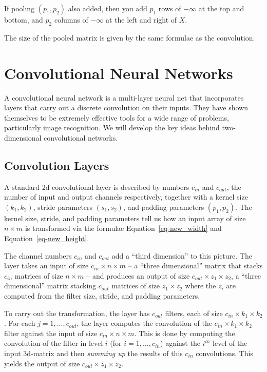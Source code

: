 \documentclass[
  11pt,
  letterpaper,
]{scrbook}
\theoremstyle{plain}
\theoremstyle{remark}
\begin{document}
If pooling \((p_1,p_2)\) also added, then you add \(p_1\) rows of
\(-\infty\) at the top and bottom, and \(p_2\) columns of \(-\infty\) at
the left and right of \(X\).

The size of the pooled matrix is given by the same formulae as the
convolution.

\hypertarget{convolutional-neural-networks}{%
\section{Convolutional Neural
Networks}\label{convolutional-neural-networks}}

A convolutional neural network is a multi-layer neural net that
incorporates layers that carry out a discrete convolution on their
inputs. They have shown themselves to be extremely effective tools for a
wide range of problems, particularly image recognition. We will develop
the key ideas behind two-dimensional convolutional networks.

\hypertarget{convolution-layers}{%
\subsection{Convolution Layers}\label{convolution-layers}}

A standard 2d convolutional layer is described by numbers \(c_{in}\) and
\(c_{out}\), the number of input and output channels respectively,
together with a kernel size \((k_1,k_2)\), stride parameters
\((s_{1},s_{2})\), and padding parameters \((p_{1},p_{2})\). The kernel
size, stride, and padding parameters tell us how an input array of size
\(n\times m\) is transformed via the formulae
Equation~\ref{eq-new_width} and Equation~\ref{eq-new_height}.

The channel numbers \(c_{in}\) and \(c_{out}\) add a ``third dimension''
to this picture. The layer takes an input of size
\(c_{in}\times n\times m\) -- a ``three dimensional'' matrix that stacks
\(c_{in}\) matrices of size \(n\times m\) -- and produces an output of
size \(c_{out}\times z_{1}\times z_{2}\), a ``three dimensional'' matrix
stacking \(c_{out}\) matrices of size \(z_{1}\times z_{2}\) where the
\(z_{i}\) are computed from the filter size, stride, and padding
parameters.

To carry out the transformation, the layer has \(c_{out}\) filters, each
of size \(c_{in}\times k_1\times k_2\). For each
\(j=1,\ldots, c_{out}\), the layer computes the convolution of the
\(c_{in}\times k_1\times k_2\) filter against the input of size
\(c_{in}\times n\times m\). This is done by computing the convolution of
the filter in level \(i\) (for \(i=1,\ldots, c_{in}\)) against the
\(i^{th}\) level of the input 3d-matrix and then \emph{summing up} the
results of this \(c_{in}\) convolutions. This yields the output of size
\(c_{out}\times z_{1}\times z_{2}\).
\end{document}
